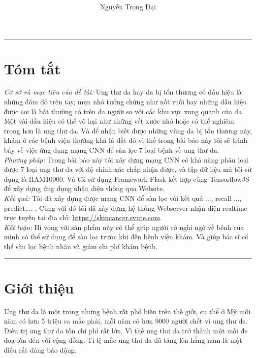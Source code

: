 \documentclass[12pt,a4paper]{article}
\title{
	\centering\normalsize  
	\vspace{-0.7in}
	\colorbox{black}{\parbox{\linewidth}{\textcolor{white}{\hfill\HCMUTE \hfill}}} \\[0.5ex]
	\begin{minipage}{\dimexpr0.5\linewidth-0.5\wlogo}\oriart\end{minipage}%
	\begin{minipage}{\dimexpr0.5\linewidth+0.5\wlogo-6pt}\LOGO \end{minipage}\\[0.5ex]
	\colorbox{black}{\parbox{\linewidth}{\textcolor{white}{\hfill\KHCMUTE\hfill}}}\\[1ex]
	\titleofArt
}
\author{Nguyễn Trọng Đại}
\date{}
\begin{document}
	\maketitle
	\thispagestyle{Initial}
	\noindent
	\rule{\textwidth}{0.4pt}
	
	\section*{Tóm tắt}
	
	\textit{Cơ sở và mục tiêu của đề tài:} Ung thư da hay da bị tổn thương có dấu hiệu là những đóm đỏ trên tay, mụn nhỏ tưởng chừng như nốt ruồi hay những dấu hiệu được coi là bất thường có trên da người so với các khu vực xung quanh của da. Một vài dấu hiệu có thể vô hại như những vết xước nhỏ hoặc có thể nghiêm trọng hơn là ung thư da. Và để nhận biết được những vùng da bị tổn thương này, khám ở các bệnh viện thường khá là đắt đỏ vì thế trong bài báo này tôi sẽ trình bày về việc ứng dụng mạng CNN để sàn lọc 7 loại bệnh về ung thư da.\\
	
	\noindent
	\textit{Phương pháp:} Trong bài báo này tôi xây dựng mạng CNN có khả năng phân loại được 7 loại ung thư da với độ chính xác chấp nhận được, và tập dữ liệu mà tôi sử dụng là HAM10000. Và tôi sử dụng Framework Flask kết hợp cùng TensorflowJS để xây dựng ứng dụng nhận diện thông qua Website.\\
	
	\noindent
	\textit{Kết quả:} Tôi đã xây dựng được mạng CNN để sàn lọc với kết quả ..., recall ..., predict,... . Cùng với đó tôi đã xây dựng hệ thống Webserver nhận diện realtime trực tuyến tại đia chỉ: \href{https://skincancer.svute.com}{https://skincancer.svute.com}.\\
	
	\noindent
	\textit{Kết luận:} Hi vọng với sản phẩm này có thể giúp người có nghi ngờ về bênh của mình có thể sử dụng để sàn lọc trước khi đến bệnh viện khám. Và giúp bác sĩ có thể sàn lọc bệnh nhân và giảm chi phí khám bệnh.
	
	\hfill \break
	\noindent
	\rule{\textwidth}{0.4pt}
	
	\section{Giới thiệu}
	Ung thư da là một trong những bệnh rất phổ biến trên thế giới, cụ thể ở Mỹ mỗi năm có hơn 5 triệu ca mắc phải, mỗi năm có hơn 9000 người chết vì ung thư da. Điều trị ung thư da tốn chi phí rất lớn. Vì thế ung thư da trở thành một mối đe doạ lớn đến với cộng đồng. Tỉ lệ mắc ung thư da đã tăng lên hằng năm là một điều rất đáng báo động.\\
	
\end{document}
